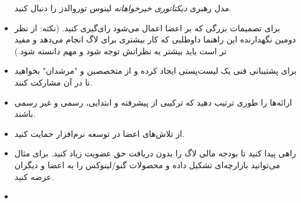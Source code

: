 \begin{itemize}
مدل رهبری
{\itshape دیکتاتوری خیرخواهانه}
لینوس توروالدز را دنبال کنید.
\item
برای تصمیمات بزرگی که بر اعضا اعمال می‌شود رای‌گیری کنید.
(نکته: از نظر دومین نگهدارنده این راهنما داوطلبی که کار بیشتری برای لاگ
انجام می‌دهد و مفید تر است باید بیشتر به نظراتش توجه شود و مهم دانسته شود.)
\item
برای پشتیبانی فنی یک لیست‌پستی ایجاد کرده و از متخصصین و "مرشدان" بخواهید تا
در آن مشارکت کنند.
\item
ارائه‌ها را طوری ترتیب دهید که ترکیبی از پیشرفته و ابتدایی، رسمی و غیر رسمی باشند.
\item
از تلاش‌های اعضا در توسعه نرم‌افزار حمایت کنید.
\item
راهی پیدا کنید تا بودجه مالی لاگ را بدون دریافت حق عضویت زیاد کنید.
برای مثال می‌توانید بازارچه‌ای تشکیل داده و محصولات گنو/لینوکس را به اعضا و
دیگران عرضه کنید.
\item


\end{itemize}
